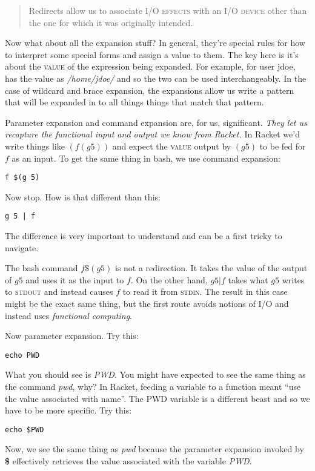 \documentclass[]{tufte-handout}
\begin{document}
\begin{quote}
Redirects allow us to associate \textsc{I/O effects} with an \textsc{I/O device} other than the one for which it was originally intended.
\end{quote}

Now what about all the expansion stuff? In general, they're special rules for how to interpret some special forms and assign a value to them.  The key here is it's about the \textsc{value} of the expression being expanded.  For example, for user jdoe, \textbf{~} has the value as \textit{/home/jdoe/} and so the two can be used interchangeably.  In the case of wildcard and brace expansion, the expansions allow us write a pattern that will be expanded in to all things things that match that pattern. 

Parameter expansion and command expansion are, for us, significant. \textit{They let us recapture the functional input and output we know from Racket.} In Racket we'd write things like $(f (g 5))$ and expect the \textsc{value} output by $(g 5)$ to be fed for $f$ as an input.  To get the same thing in bash, we use command expansion:
\begin{verbatim}
f $(g 5)
\end{verbatim}
Now stop.  How is that different than this:
\begin{verbatim}
g 5 | f
\end{verbatim}
The difference is very important to understand and can be a first tricky to navigate. 

The bash command $f \$(g 5)$ is not a redirection. It takes the value of the output of $g 5$ and uses it as the input to $f$. On the other hand, $g 5 | f$ takes what $g 5$ writes to \textsc{stdout} and instead causes $f$ to read it from \textsc{stdin}.  The result in this case might be the exact same thing, but the first route avoids notions of \textsc{I/O} and instead uses \textit{functional computing}.  

Now parameter expansion.  Try this:
\begin{verbatim}
echo PWD
\end{verbatim}
What you should see is \textit{PWD}.  You might have expected to see the same thing as the command \textit{pwd}, why? In Racket, feeding a variable to a function meant ``use the value associated with name''.  The PWD variable is a different beast and so we have to be more specific. Try this:
\begin{verbatim}
echo $PWD
\end{verbatim}
Now, we see the same thing as \textit{pwd} because the parameter expansion invoked by \textbf{\$} effectively retrieves the value associated with the variable \textit{PWD}. 
\end{document}
